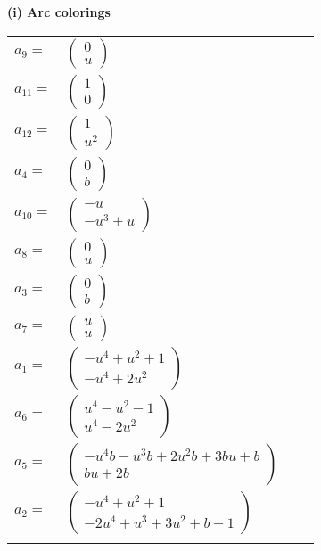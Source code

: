 \documentclass[1p]{elsarticle_modified}
\theoremstyle{definition}
\begin{document}
\flushleft \textbf{(i) Arc colorings}\\
\begin{tabular}{m{7pt} m{180pt} m{7pt} m{180pt} }
\flushright $a_{9}=$&$\begin{pmatrix}0\\u\end{pmatrix}$ \\
\flushright $a_{11}=$&$\begin{pmatrix}1\\0\end{pmatrix}$ \\
\flushright $a_{12}=$&$\begin{pmatrix}1\\u^2\end{pmatrix}$ \\
\flushright $a_{4}=$&$\begin{pmatrix}0\\b\end{pmatrix}$ \\
\flushright $a_{10}=$&$\begin{pmatrix}- u\\- u^3+u\end{pmatrix}$ \\
\flushright $a_{8}=$&$\begin{pmatrix}0\\u\end{pmatrix}$ \\
\flushright $a_{3}=$&$\begin{pmatrix}0\\b\end{pmatrix}$ \\
\flushright $a_{7}=$&$\begin{pmatrix}u\\u\end{pmatrix}$ \\
\flushright $a_{1}=$&$\begin{pmatrix}- u^4+u^2+1\\- u^4+2 u^2\end{pmatrix}$ \\
\flushright $a_{6}=$&$\begin{pmatrix}u^4- u^2-1\\u^4-2 u^2\end{pmatrix}$ \\
\flushright $a_{5}=$&$\begin{pmatrix}- u^4 b- u^3 b+2 u^2 b+3 b u+b\\b u+2 b\end{pmatrix}$ \\
\flushright $a_{2}=$&$\begin{pmatrix}- u^4+u^2+1\\-2 u^4+u^3+3 u^2+b-1\end{pmatrix}$\\&\end{tabular}
\end{document}
